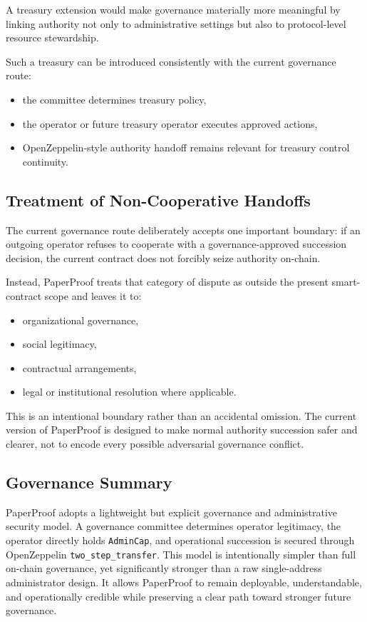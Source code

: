 \documentclass[journal]{IEEEtran}
\begin{document}
A treasury extension would make governance materially more meaningful by linking authority not only to administrative settings but also to protocol-level resource stewardship.

Such a treasury can be introduced consistently with the current governance route:
\begin{itemize}
    \item the committee determines treasury policy,
    \item the operator or future treasury operator executes approved actions,
    \item OpenZeppelin-style authority handoff remains relevant for treasury control continuity.
\end{itemize}


\subsection{Treatment of Non-Cooperative Handoffs}

The current governance route deliberately accepts one important boundary: if an outgoing operator refuses to cooperate with a governance-approved succession decision, the current contract does not forcibly seize authority on-chain.

Instead, PaperProof treats that category of dispute as outside the present smart-contract scope and leaves it to:
\begin{itemize}
    \item organizational governance,
    \item social legitimacy,
    \item contractual arrangements,
    \item legal or institutional resolution where applicable.
\end{itemize}


This is an intentional boundary rather than an accidental omission. The current version of PaperProof is designed to make normal authority succession safer and clearer, not to encode every possible adversarial governance conflict.

\subsection{Governance Summary}

PaperProof adopts a lightweight but explicit governance and administrative security model. A governance committee determines operator legitimacy, the operator directly holds \texttt{AdminCap}, and operational succession is secured through OpenZeppelin \texttt{two\_step\_transfer}. This model is intentionally simpler than full on-chain governance, yet significantly stronger than a raw single-address administrator design. It allows PaperProof to remain deployable, understandable, and operationally credible while preserving a clear path toward stronger future governance.
\end{document}
